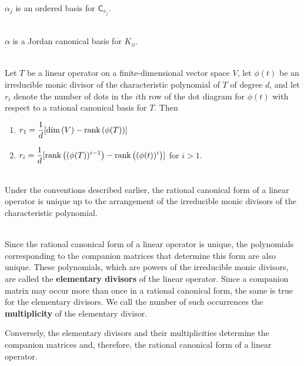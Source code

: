 \begin{lemma}
	\hfill\\
	$\alpha_j$ is an ordered basis for $\mathsf{C}_{v_j}$.
\end{lemma}

\begin{lemma}
	\hfill\\
	$\alpha$ is a Jordan canonical basis for $K_\phi$.
\end{lemma}

\begin{theorem}
	\hfill\\
	Let $T$ be a linear operator on a finite-dimensional vector space $V$, let $\phi(t)$ be an irreducible monic divisor of the characteristic polynomial of $T$ of degree $d$, and let $r_i$ denote the number of dots in the $i$th row of the dot diagram for $\phi(t)$ with respect to a rational canonical basis for $T$. Then

	\begin{enumerate}
		\item $r_1 = \displaystyle\frac{1}{d}[\text{dim}\left(V\right)-\text{rank}\left(\phi(T)\right)]$
		\item $r_i = \displaystyle\frac{1}{d}[\text{rank}\left((\phi(T))^{i-1}\right) - \text{rank}\left((\phi(t))^i\right)]$ for $i > 1$.
	\end{enumerate}
\end{theorem}

\begin{corollary}
	\hfill\\
	Under the conventions described earlier, the rational canonical form of a linear operator is unique up to the arrangement of the irreducible monic divisors of the characteristic polynomial.
\end{corollary}

\begin{definition}
	\hfill\\
	Since the rational canonical form of a linear operator is unique, the polynomials corresponding to the companion matrices that determine this form are also unique. These polynomials, which are powers of the irreducible monic divisors, are called the \textbf{elementary divisors} of the linear operator. Since a companion matrix may occur more than once in a rational canonical form, the same is true for the elementary divisors. We call the number of such occurrences the \textbf{multiplicity} of the elementary divisor.

	Conversely, the elementary divisors and their multiplicities determine the companion matrices and, therefore, the rational canonical form of a linear operator.
\end{definition}

